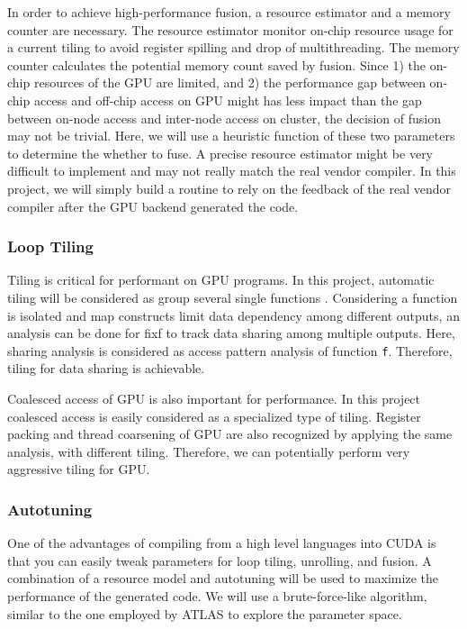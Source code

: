 In order to achieve high-performance fusion, a resource estimator and a
memory counter are necessary. The resource estimator monitor on-chip
resource usage for a current tiling to avoid register spilling and drop
of multithreading. The memory counter calculates the potential
memory count saved by fusion. Since 1) the on-chip resources of the GPU are
limited, and 2) the performance gap between on-chip access and off-chip
access on GPU might has less impact than the gap between on-node access
and inter-node access on cluster, the decision of fusion may not be
trivial. Here, we will use a heuristic function of these two parameters to
determine the whether to fuse. A precise resource estimator might be
very difficult to implement and may not really match the real vendor
compiler. In this project, we will simply build a routine to rely on the
feedback of the real vendor compiler after the GPU backend generated the
code.

\subsubsection{Loop Tiling}\label{loop-tiling}

Tiling is critical for performant on GPU programs. In this project,
automatic tiling will be considered as group several single functions
. Considering a function  is isolated and map constructs limit
data dependency among different outputs, an analysis can be done for
fix{f} to track data sharing among multiple outputs. Here,
sharing analysis is considered as access pattern analysis of function
\texttt{f}. Therefore, tiling for data sharing is achievable.

Coalesced access of GPU is also important for performance. In this
project coalesced access is easily considered as a specialized type of
tiling. Register packing and thread coarsening of GPU are also
recognized by applying the same analysis, with different tiling.
Therefore, we can potentially perform very aggressive tiling for GPU.

\subsubsection{Autotuning}\label{autotuning}

One of the advantages of compiling from a high level languages into CUDA
is that you can easily tweak parameters for loop tiling, unrolling, and
fusion. A combination of a resource model and autotuning will be used to
maximize the performance of the generated code. We will use a brute-force-like
algorithm, similar to the one employed by ATLAS\cite{atlas} to explore the
parameter space.
